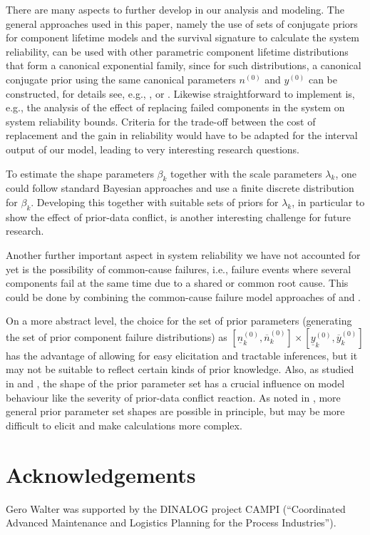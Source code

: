 \documentclass[Journal,letterpaper]{ascelike-new}
\newcommand{\uz}{^{(0)}} %
\newcommand{\ul}[1]{\underline{#1}}
\newcommand{\ol}[1]{\overline{#1}}
\newcommand{\lRsys}{\ul{R}_\text{sys}}
\newcommand{\uRsys}{\ol{R}_\text{sys}}
\def\yz{y\uz}
\def\ykzl{\ul{y}\uz_k}
\def\ykzu{\ol{y}\uz_k}
\def\nz{n\uz}
\def\nkzl{\ul{n}\uz_k}
\def\nkzu{\ol{n}\uz_k}
\def\tnow{t_\text{now}}
\begin{document}
There are many aspects to further develop in our analysis and modeling.
The general approaches used in this paper,
namely the use of sets of conjugate priors for component lifetime models
and the survival signature to calculate the system reliability,
can be used with other parametric component lifetime distributions
that form a canonical exponential family,
since for such distributions, a canonical conjugate prior
using the same canonical parameters $\nz$ and $\yz$ can be constructed,
for details see, e.g., , or .
%
Likewise straightforward to implement is, e.g., the analysis of the effect of replacing failed components
in the system on system reliability bounds. %
Criteria for the trade-off between the cost of replacement and the gain in reliability
would have to be adapted for the interval output of our model,
leading to very interesting research questions.

To estimate the shape parameters $\beta_k$ together with the scale parameters $\lambda_k$,
one could follow standard Bayesian approaches and use a finite discrete distribution for $\beta_k$.
Developing this together with suitable sets of priors for $\lambda_k$,
in particular to show the effect of prior-data conflict, is another interesting challenge for future research.

Another further important aspect in system reliability we have not accounted for yet
is the possibility of common-cause failures,
i.e., failure events where several components fail at the same time due to a shared or common root cause.
This could be done by combining the common-cause failure model approaches
of  and .

On a more abstract level, the choice for the set of prior parameters
(generating the set of prior component failure distributions) as $[\nkzl, \nkzu] \times [\ykzl, \ykzu]$
has the advantage of allowing for easy elicitation and tractable inferences,
but it may not be suitable to reflect certain kinds of prior knowledge.
Also, as studied in \cite{Walter2011a} and \cite[\S 3.1]{diss},
the shape of the prior parameter set has a crucial influence on model behaviour
like the severity of prior-data conflict reaction.
As noted in \cite[pp.~66f]{diss},
more general prior parameter set shapes are possible in principle,
but may be more difficult to elicit and make calculations more complex.


\section*{Acknowledgements}

Gero Walter was supported by the DINALOG project CAMPI
(``Coordinated Advanced Maintenance and Logistics Planning for the Process Industries'').


\pagebreak
%
\appendix
%
%
%

%
\end{document}
